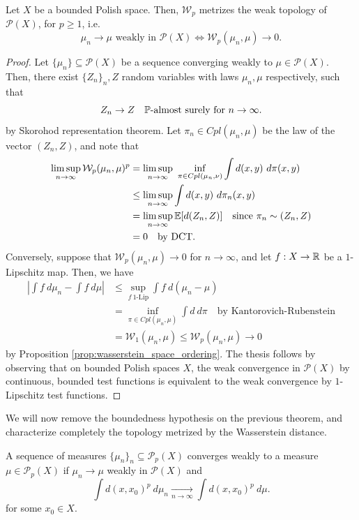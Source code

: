 \documentclass[../main.tex]{subfiles}
\begin{document}
\begin{theorem}
    Let $X$ be a bounded Polish space. Then, $\mathcal{W}_p$ metrizes the weak topology of $\mathcal{P}(X)$, for $p\geq 1$, i.e. $$\mu_n\to\mu \text{ weakly in } \mathcal{P}(X) \iff \mathcal{W}_p(\mu_n, \mu) \to 0.$$
\end{theorem}
\begin{proof}
    Let $\{\mu_n\}\subseteq\mathcal{P}(X)$ be a sequence converging weakly to $\mu\in\mathcal{P}(X)$. Then, there exist $\{Z_n\}_n, Z$ random variables with laws $\mu_n, \mu$ respectively, such that $$Z_n\to Z \quad \text{$\mathbb{P}$-almost surely for $n\to\infty$.}$$ by Skorohod representation theorem. Let $\pi_n \in Cpl(\mu_n, \mu)$ be the law of the vector $(Z_n, Z)$, and note that
    \begin{align*}
        \limsup_{n\to\infty} \mathcal{W}_p(\mu_n, \mu)^p 
        &= \limsup_{n\to\infty} \ \inf_{\pi\in Cpl(\mu_n, \nu)} \int d(x, y) \ d\pi(x, y) \\
        &\leq \limsup_{n\to\infty} \int d(x, y) \ d\pi_n(x, y) \\
        &= \limsup_{n\to \infty} \mathbb{E}[d(Z_n, Z)] \quad \text{since } \pi_n\sim(Z_n, Z) \\
        &=0 \quad \text{by DCT.}
    \end{align*}
    Conversely, suppose that $\mathcal{W}_p(\mu_n, \mu)\to 0$ for $n\to\infty$, and let $f: X\to \mathbb{R}$ be a $1$-Lipschitz map. Then, we have 
    \begin{align*}
        \left|\int f \ d\mu_n - \int f \ d\mu\right| 
        &\leq \sup_{f \ 1\text{-Lip}} \int f \ d(\mu_n - \mu) \\
        &= \inf_{\pi\in Cpl(\mu_n, \mu)} \int d \ d\pi \quad \text{by Kantorovich-Rubenstein} \\
        &= \mathcal{W}_1(\mu_n, \mu) \leq \mathcal{W}_p(\mu_n, \mu) \to 0
    \end{align*}
    by Proposition \ref{prop:wasserstein_space_ordering}. The thesis follows by observing that on bounded Polish spaces $X$, the weak convergence in $\mathcal{P}(X)$ by continuous, bounded test functions is equivalent to the weak convergence by $1$-Lipschitz test functions.
\end{proof}

We will now remove the boundedness hypothesis on the previous theorem, and characterize completely the topology metrized by the Wasserstein distance.

\begin{definition}
    A sequence of measures $\{\mu_n\}_n\subseteq\mathcal{P}_p(X)$ converges weakly to a measure $\mu\in\mathcal{P}_p(X)$ if $\mu_n \to \mu$ weakly in $\mathcal{P}(X)$ and
    $$
    \int d(x, x_0)^p \ d\mu_n \underset{n\to\infty}{\longrightarrow} \int d(x, x_0)^p \ d\mu.
    $$
    for some $x_0\in X$.
\end{definition}
\end{document}
